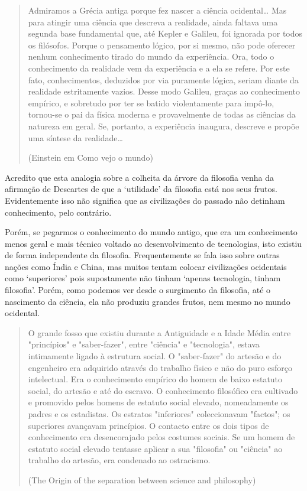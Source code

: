 \begin{quote}
Admiramos a Grécia antiga porque fez nascer a ciência ocidental… Mas para atingir uma ciência que descreva a realidade, ainda faltava uma segunda base fundamental que, até Kepler e Galileu, foi ignorada por todos os filósofos. Porque o pensamento lógico, por si mesmo, não pode oferecer nenhum conhecimento tirado do mundo da experiência. Ora, todo o conhecimento da realidade vem da experiência e a ela se refere. Por este fato, conhecimentos, deduzidos por via puramente lógica, seriam diante da realidade estritamente vazios. Desse modo Galileu, graças ao conhecimento empírico, e sobretudo por ter se batido violentamente para impô-lo, tornou-se o pai da física moderna e provavelmente de todas as ciências da natureza em geral. Se, portanto, a experiência inaugura, descreve e propõe uma síntese da realidade…

(Einstein em Como vejo o mundo)
\end{quote}

Acredito que esta analogia sobre a colheita da árvore da filosofia venha da afirmação de Descartes de que a ‘utilidade’ da filosofia está nos seus frutos. Evidentemente isso não significa que as civilizações do passado não detinham conhecimento, pelo contrário.

Porém, se pegarmos o conhecimento do mundo antigo, que era um conhecimento menos geral e mais técnico voltado ao desenvolvimento de tecnologias, isto existiu de forma independente da filosofia. Frequentemente se fala isso sobre outras nações como Índia e China, mas muitos tentam colocar civilizações ocidentais como ‘superiores’ pois supostamente não tinham ‘apenas tecnologia, tinham filosofia’. Porém, como podemos ver desde o surgimento da filosofia, até o nascimento da ciência, ela não produziu grandes frutos, nem mesmo no mundo ocidental.

\begin{quote}
O grande fosso que existiu durante a Antiguidade e a Idade Média entre "princípios" e "saber-fazer", entre "ciência" e "tecnologia", estava intimamente ligado à estrutura social. O "saber-fazer" do artesão e do engenheiro era adquirido através do trabalho físico e não do puro esforço intelectual. Era o conhecimento empírico do homem de baixo estatuto social, do artesão e até do escravo. O conhecimento filosófico era cultivado e promovido pelos homens de estatuto social elevado, nomeadamente os padres e os estadistas. Os estratos "inferiores" coleccionavam "factos"; os superiores avançavam princípios. O contacto entre os dois tipos de conhecimento era desencorajado pelos costumes sociais. Se um homem de estatuto social elevado tentasse aplicar a sua "filosofia" ou "ciência" ao trabalho do artesão, era condenado ao ostracismo.

(The Origin of the separation between science and philosophy)
\end{quote}

